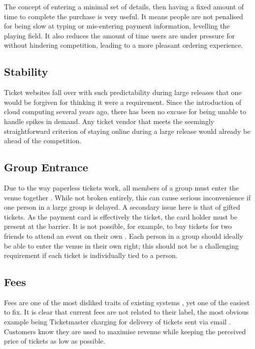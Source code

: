 \documentclass[12pt,a4paper]{bhamdissertation}
\begin{document}
The concept of entering a minimal set of details, then having a fixed amount of time to complete the purchase is very useful. It means people are not penalised for being slow at typing or mis-entering payment information, levelling the playing field. It also reduces the amount of time users are under pressure for without hindering competition, leading to a more pleasant ordering experience.

\subsection{Stability}

Ticket websites fall over with such predictability during large releases \cite{B10} that one would be forgiven for thinking it were a requirement. Since the introduction of cloud computing several years ago, there has been no excuse for being unable to handle spikes in demand. Any ticket vendor that meets the seemingly straightforward criterion of staying online during a large release would already be ahead of the competition.

\subsection{Group Entrance}

Due to the way paperless tickets work, all members of a group must enter the venue together \cite{T166}. While not broken entirely, this can cause serious inconvenience if one person in a large group is delayed. A secondary issue here is that of gifted tickets. As the payment card is effectively the ticket, the card holder must be present at the barrier. It is not possible, for example, to buy tickets for two friends to attend an event on their own \cite{T166}. Each person in a group should ideally be able to enter the venue in their own right; this should not be a challenging requirement if each ticket is individually tied to a person.

\subsection{Fees}

Fees are one of the most disliked traits of existing systems \cite{P12}, yet one of the easiest to fix. It is clear that current fees are not related to their label, the most obvious example being Ticketmaster charging for delivery of tickets sent via email \cite{P12}. Customers know they are used to maximise revenue while keeping the perceived price of tickets as low as possible.
\end{document}
